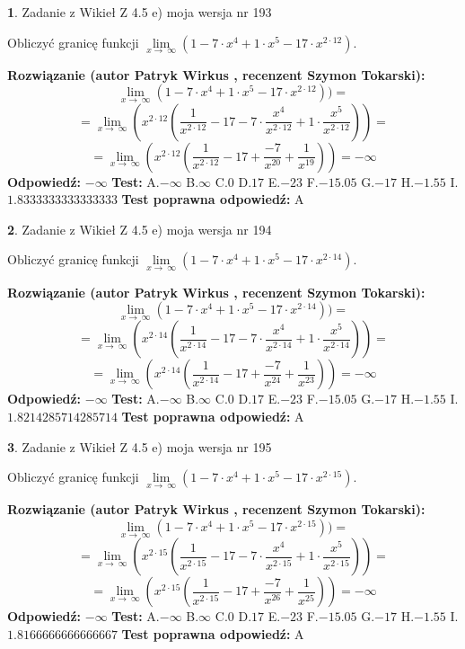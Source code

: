 \documentclass[12pt, a4paper]{article}
\theoremstyle{definition} %
\newtheorem{zad}{}
\newcommand{\zadStart}[1]{\begin{zad}#1\newline}
\newcommand{\zadStop}{\end{zad}}
\newcommand{\rozwStart}[2]{\noindent \textbf{Rozwiązanie (autor #1 , recenzent #2): }\newline}
\newcommand{\rozwStop}{\newline}
\newcommand{\odpStart}{\noindent \textbf{Odpowiedź:}\newline}
\newcommand{\odpStop}{\newline}
\newcommand{\testStart}{\noindent \textbf{Test:}\newline}
\newcommand{\testStop}{\newline}
\newcommand{\kluczStart}{\noindent \textbf{Test poprawna odpowiedź:}\newline}
\newcommand{\kluczStop}{\newline}
\begin{document}
\zadStart{Zadanie z Wikieł Z 4.5 e) moja wersja nr 193}


Obliczyć granicę funkcji  $\lim\limits_{x\to\ \infty}(1 - 7 \cdot x^{4}+1 \cdot x^{5}- 17 \cdot x^{2\cdot12})$.
\zadStop
\rozwStart{Patryk Wirkus}{Szymon Tokarski}
$$\lim\limits_{x\to\ \infty}(1 - 7 \cdot x^{4}+1 \cdot x^{5}- 17 \cdot x^{2\cdot12}))=$$
$$=\lim\limits_{x\to\ \infty}(x^{2\cdot12}(\frac{1}{x^{2\cdot12}}-17 -7 \cdot \frac{x^{4}}{x^{2\cdot12}}+1 \cdot \frac{x^{5}}{x^{2\cdot12}}))=$$
$$=\lim\limits_{x\to\ \infty}(x^{2\cdot12}(\frac{1}{x^{2\cdot12}}-17 + \frac{-7}{x^{20}}+ \frac{1}{x^{19}}))=-\infty$$
\rozwStop
\odpStart
$-\infty$
\odpStop
\testStart
A.$-\infty$ B.$\infty$ C.$0$ D.$17$ E.$-23$
F.$-15.05$ G.$-17$
H.$-1.55$
I.$1.8333333333333333$
\testStop
\kluczStart
A
\kluczStop



\zadStart{Zadanie z Wikieł Z 4.5 e) moja wersja nr 194}


Obliczyć granicę funkcji  $\lim\limits_{x\to\ \infty}(1 - 7 \cdot x^{4}+1 \cdot x^{5}- 17 \cdot x^{2\cdot14})$.
\zadStop
\rozwStart{Patryk Wirkus}{Szymon Tokarski}
$$\lim\limits_{x\to\ \infty}(1 - 7 \cdot x^{4}+1 \cdot x^{5}- 17 \cdot x^{2\cdot14}))=$$
$$=\lim\limits_{x\to\ \infty}(x^{2\cdot14}(\frac{1}{x^{2\cdot14}}-17 -7 \cdot \frac{x^{4}}{x^{2\cdot14}}+1 \cdot \frac{x^{5}}{x^{2\cdot14}}))=$$
$$=\lim\limits_{x\to\ \infty}(x^{2\cdot14}(\frac{1}{x^{2\cdot14}}-17 + \frac{-7}{x^{24}}+ \frac{1}{x^{23}}))=-\infty$$
\rozwStop
\odpStart
$-\infty$
\odpStop
\testStart
A.$-\infty$ B.$\infty$ C.$0$ D.$17$ E.$-23$
F.$-15.05$ G.$-17$
H.$-1.55$
I.$1.8214285714285714$
\testStop
\kluczStart
A
\kluczStop



\zadStart{Zadanie z Wikieł Z 4.5 e) moja wersja nr 195}


Obliczyć granicę funkcji  $\lim\limits_{x\to\ \infty}(1 - 7 \cdot x^{4}+1 \cdot x^{5}- 17 \cdot x^{2\cdot15})$.
\zadStop
\rozwStart{Patryk Wirkus}{Szymon Tokarski}
$$\lim\limits_{x\to\ \infty}(1 - 7 \cdot x^{4}+1 \cdot x^{5}- 17 \cdot x^{2\cdot15}))=$$
$$=\lim\limits_{x\to\ \infty}(x^{2\cdot15}(\frac{1}{x^{2\cdot15}}-17 -7 \cdot \frac{x^{4}}{x^{2\cdot15}}+1 \cdot \frac{x^{5}}{x^{2\cdot15}}))=$$
$$=\lim\limits_{x\to\ \infty}(x^{2\cdot15}(\frac{1}{x^{2\cdot15}}-17 + \frac{-7}{x^{26}}+ \frac{1}{x^{25}}))=-\infty$$
\rozwStop
\odpStart
$-\infty$
\odpStop
\testStart
A.$-\infty$ B.$\infty$ C.$0$ D.$17$ E.$-23$
F.$-15.05$ G.$-17$
H.$-1.55$
I.$1.8166666666666667$
\testStop
\kluczStart
A
\kluczStop
\end{document}
